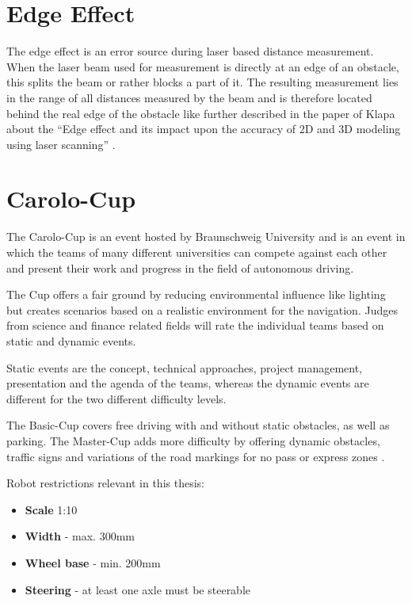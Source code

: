 \section{Edge Effect}

The edge effect is an error source during laser based distance measurement.
When the laser beam used for measurement is directly at an edge of an obstacle, this splits the beam or rather blocks a part of it. The resulting measurement lies in the range of all distances measured by the beam and is therefore located behind the real edge of the obstacle like further described in the paper of Klapa about the ``Edge effect and its impact upon the accuracy of 2D and 3D modeling using laser scanning'' \cite{edgeeffect}.\\


\section{Carolo-Cup}
The Carolo-Cup is an event hosted by Braunschweig University and is an event in which the teams of many different universities can compete against each other and present their work and progress in the field of autonomous driving.

The Cup offers a fair ground by reducing environmental influence like lighting but creates scenarios based on a realistic environment for the navigation. Judges from science and finance related fields will rate the individual teams based on static and dynamic events.

Static events are the concept, technical approaches, project management, presentation and the agenda of the teams, whereas the dynamic events are different for the two different difficulty levels.

The Basic-Cup covers free driving with and without static obstacles, as well as parking. The Master-Cup adds more difficulty by offering dynamic obstacles, traffic signs and variations of the road markings for no pass or express zones\cite{carolocup} \cite{vdecarolo}.

Robot restrictions relevant in this thesis:
\begin{itemize}
	\item \textbf{Scale} 1:10
	\item \textbf{Width} - max. 300mm
	\item \textbf{Wheel base} - min. 200mm
	\item \textbf{Steering} - at least one axle must be steerable
\end{itemize}

